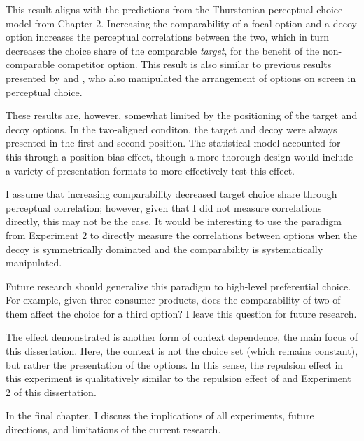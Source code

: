 This result aligns with the predictions from the Thurstonian perceptual choice model from Chapter 2. Increasing the comparability of a focal option and a decoy option increases the perceptual correlations between the two, which in turn decreases the choice share of the comparable \textit{target}, for the benefit of the non-comparable competitor option. This result is also similar to previous results presented by \textcite{trueblood2022attentional} and \textcite{evansImpactPresentationOrder2021}, who also manipulated the arrangement of options on screen in perceptual choice.

These results are, however, somewhat limited by the positioning of the target and decoy options. In the two-aligned conditon, the target and decoy were always presented in the first and second position. The statistical model accounted for this through a position bias effect, though a more thorough design would include a variety of presentation formats to more effectively test this effect.

I assume that increasing comparability decreased target choice share through perceptual correlation; however, given that I did not measure correlations directly, this may not be the case. It would be interesting to use the paradigm from Experiment 2 to directly measure the correlations between options when the decoy is symmetrically dominated and the comparability is systematically manipulated.

Future research should generalize this paradigm to high-level preferential choice. For example, given three consumer products, does the comparability of two of them affect the choice for a third option? I leave this question for future research.

The effect demonstrated is another form of context dependence, the main focus of this dissertation. Here, the context is not the choice set (which remains constant), but rather the presentation of the options. In this sense, the repulsion effect in this experiment is qualitatively similar to the repulsion effect of \textcite{spektorWhenGoodLooks2018b} and Experiment 2 of this dissertation.

In the final chapter, I discuss the implications of all experiments, future directions, and limitations of the current research. 